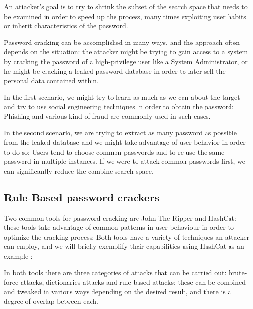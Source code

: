 An attacker's goal is to try to shrink the subset of the search space that needs to be examined in order to speed up the process, many times exploiting user habits or inherit characteristics of the password.\newline


Password cracking can be accomplished in many ways, and the approach often depends on the situation: the attacker might be trying to gain access to a system by cracking the password of a high-privilege user like a System Administrator, or he might be cracking a leaked password database in order to later sell the personal data contained within.

In the first scenario, we might try to learn as much as we can about the target and try to use social engineering techniques in order to obtain the password; Phishing and various kind of fraud are commonly used in such cases. %

In the second scenario, we are trying to extract as many password as possible from the leaked database and we might take advantage of user behavior in order to do so: Users tend to choose common passwords and to re-use the same password in multiple instances.%
If we were to attack common passwords first, we can significantly reduce the combine search space.

\subsection{Rule-Based password crackers} \label{hash_and_jtr}

Two common tools for password cracking are John The Ripper and \break \mbox{HashCat}\cite{john,hash_cat}: these tools take advantage of common patterns in user behaviour in order to optimize the cracking process: Both tools have a variety of techniques an attacker can employ, and we will briefly exemplify their capabilities using HashCat as an example \cite{hash_cat_wiki}: \newline

In both tools there are three categories of attacks that can be carried out: brute-force attacks, dictionaries attacks and rule based attacks: these can be combined and tweaked in various ways depending on the desired result, and there is a degree of overlap between each.\newline 

